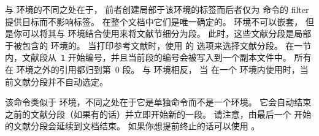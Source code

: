 \begin{ltxsyntax}



 与  环境的不同之处在于，
前者创建局部于该环境的标签而后者仅为  命令的  filter 提供目标而不影响标签。
在整个文档中它们是唯一确定的。
 环境不可以嵌套，
但是你可以将其与  环境结合使用来将文献节细分为段。
此时，这些文献分段是局部于被包含的  环境的。
当打印参考文献时，使用  的  选项来选择文献分段。
在一节内，文献段从~\texttt{1} 开始编号，并且当前段的编号会被写入到一个副本文件中。
所有在  环境之外的引用都归到第~0 段。
与  环境相反，
当  在一个  环境内使用时，当前文献分段并不自动选定。



该命令类似于  环境，不同之处在于它是单独命令而不是一个环境。
它会自动结束之前的文献分段（如果有的话）并立即开始新的一段。
请注意，由最后一个  开始的文献分段会延续到文档结束。
如果你想提前终止的话可以使用 。

\end{ltxsyntax}

